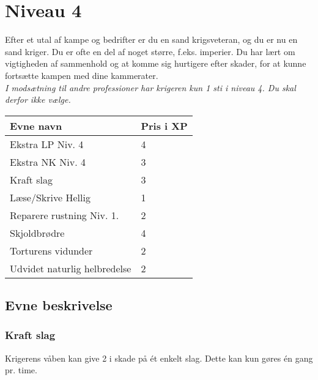 \chapter*{Niveau 4}

Efter et utal af kampe og bedrifter er du en sand krigsveteran, og du er nu en sand kriger. Du er ofte en del af noget større, f.eks. imperier. Du har lært om vigtigheden af sammenhold og at komme sig hurtigere efter skader, for at kunne fortsætte kampen med dine kammerater.\\
\emph{I modsætning til andre professioner har krigeren kun 1 sti i niveau 4. Du skal derfor ikke vælge.}\\

\begin{table}[H]
    \centering
    \begin{tabular}{|p{}|p{}|}
    \rowcolor{cerulean!80}\hline
        Evne navn & Pris i XP \\\hline
        Ekstra LP Niv. 4 & 4\\\hline
        Ekstra NK Niv. 4 & 3\\\hline
        Kraft slag & 3 \\\hline
        Læse/Skrive Hellig & 1 \\\hline
        Reparere rustning Niv. 1. & 2\\\hline
        Skjoldbrødre & 4\\\hline
        Torturens vidunder & 2\\\hline
        Udvidet naturlig helbredelse & 2 \\\hline
    \end{tabular}
\end{table}
\section*{Evne beskrivelse}





\subsection*{Kraft slag}
Krigerens våben kan give 2 i skade på ét enkelt slag. Dette kan kun gøres én gang pr. time.

